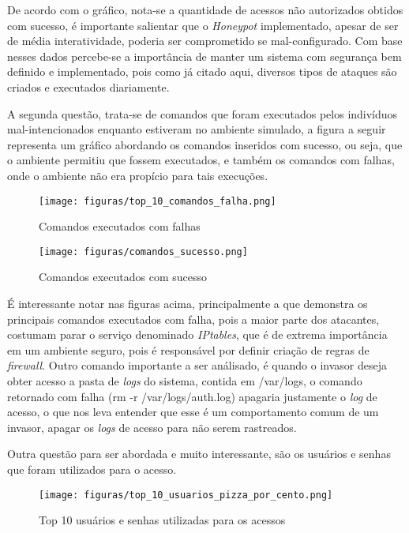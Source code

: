 De acordo com o gráfico, nota-se a quantidade de acessos não autorizados obtidos com sucesso, é importante salientar que o \textit{Honeypot} implementado, apesar de ser de média interatividade, poderia ser comprometido se mal-configurado. Com base nesses dados percebe-se a importância de manter um sistema com segurança bem definido e implementado, pois como já citado aqui, diversos tipos de ataques são criados e executados diariamente.

A segunda questão, trata-se de comandos que foram executados pelos indivíduos mal-intencionados enquanto estiveram no ambiente simulado, a figura a seguir representa um gráfico abordando os comandos inseridos com sucesso, ou seja, que o ambiente permitiu que fossem executados, e também os comandos com falhas, onde o ambiente não era propício para tais execuções.

\newpage
\begin{figure}[!h]
\centering
\texttt{[image: figuras/top\_10\_comandos\_falha.png]}
\caption{Comandos executados com falhas} 	
\end{figure}

\begin{figure}[!h]
\centering
\texttt{[image: figuras/comandos\_sucesso.png]}
\caption{Comandos executados com sucesso} 	
\end{figure}

É interessante notar nas figuras acima, principalmente a que demonstra os principais comandos executados com falha, pois a maior parte dos atacantes, costumam parar o serviço denominado \textit{IPtables}, que é de extrema importância em um ambiente seguro, pois é responsável por definir criação de regras de \textit{firewall}. Outro comando importante a ser análisado, é quando o invasor deseja obter acesso a pasta de \textit{logs} do sistema, contida em /var/logs, o comando retornado com falha (rm -r /var/logs/auth.log) apagaria justamente o \textit{log} de acesso, o que nos leva entender que esse é um comportamento comum de um invasor, apagar os \textit{logs} de acesso para não serem rastreados.

Outra questão para ser abordada e muito interessante, são os usuários e senhas que foram utilizados para o acesso. 

\begin{figure}[!h]
\centering
\texttt{[image: figuras/top\_10\_usuarios\_pizza\_por\_cento.png]}
\caption{Top 10 usuários e senhas utilizadas para os acessos} 	
\end{figure}

